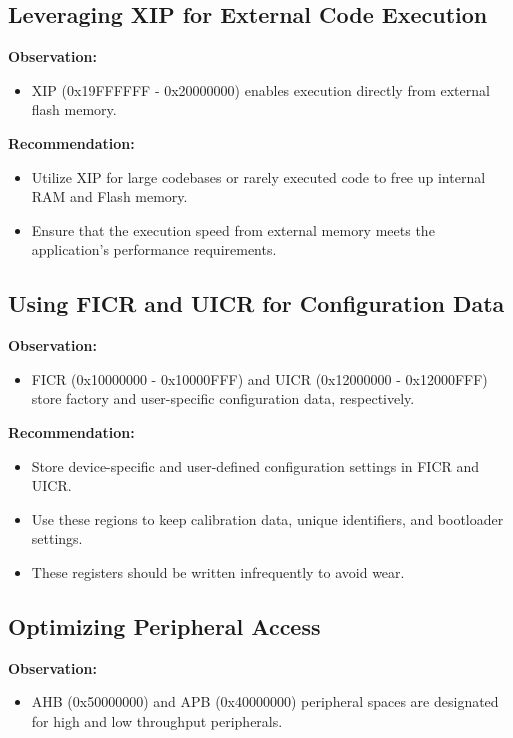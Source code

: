 \documentclass{Configuration_Files/PoliMi3i_thesis}
\begin{document}
\subsection{Leveraging XIP for External Code Execution}
\textbf{Observation:}
\begin{itemize}
    \item XIP (0x19FFFFFF - 0x20000000) enables execution directly from external flash memory.
\end{itemize}

\textbf{Recommendation:}
\begin{itemize}
    \item Utilize XIP for large codebases or rarely executed code to free up internal RAM and Flash memory.
    \item Ensure that the execution speed from external memory meets the application's performance requirements.
\end{itemize}

\subsection{Using FICR and UICR for Configuration Data}
\textbf{Observation:}
\begin{itemize}
    \item FICR (0x10000000 - 0x10000FFF) and UICR (0x12000000 - 0x12000FFF) store factory and user-specific configuration data, respectively.
\end{itemize}

\textbf{Recommendation:}
\begin{itemize}
    \item Store device-specific and user-defined configuration settings in FICR and UICR.
    \item Use these regions to keep calibration data, unique identifiers, and bootloader settings.
    \item These registers should be written infrequently to avoid wear.
\end{itemize}

\subsection{Optimizing Peripheral Access}
\textbf{Observation:}
\begin{itemize}
    \item AHB (0x50000000) and APB (0x40000000) peripheral spaces are designated for high and low throughput peripherals.
\end{itemize}
\end{document}
